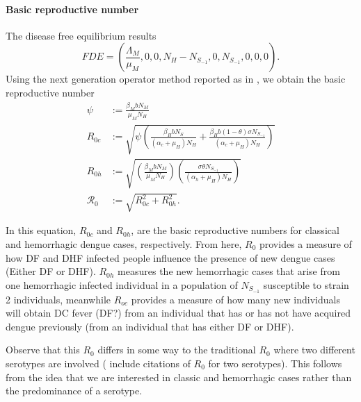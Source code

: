 

%
%
\paragraph{Basic reproductive number}
	The disease free equilibrium results
$$
	FDE=
	\left(
		\frac{\Lambda_M}{\mu_M},
		0,
		0,
		N_H - N_{S_{-1}},
		0,
		N_{S_{-1}},
		0,
		0,
		0
	\right).
$$
Using the next generation operator method 
reported as in \cite{Feng1997a}, we obtain
the basic reproductive number
%
\begin{equation}
	\begin{aligned}
		\psi &:= \frac{\beta_MbN_M}{\mu_MN_H}
		\\
		R_{0c} & := \sqrt{
			\psi
			\left(
				\frac{\beta_HbN_S}{ (\alpha_c + \mu_H)N_H}
				+
				\frac{\beta_Hb(1- \theta ) \sigma N_{S_{-1}}}{ (\alpha_c + \mu_H)N_H}
			\right)}
		\\
		R_{0h}& :=\sqrt{
			\left(\frac{\beta_MbN_M}{\mu_MN_H}\right)
				\left(\frac{
					\sigma \theta N_{S_{-1}}
				}{(\alpha_h + \mu_H)N_H}\right)}
	\\
	\mathcal{R}_0 & :=
			\sqrt{ R_{0c}^2+R_{0h}^2 }.
	\end{aligned}
\end{equation}

	In this equation, $R_{0c}$ and $R_{0h}$, are the basic reproductive numbers 
for classical and hemorrhagic dengue cases, respectively. From here, $R_0$ 
provides a measure of how DF and DHF infected people influence the presence of 
new dengue cases (Either DF or DHF). $R_{0h}$ measures the new hemorrhagic 
cases that arise from one hemorrhagic infected individual in a population of 
$N_{S_{-1}}$ susceptible to strain 2 individuals, meanwhile $R_{oc}$ provides a 
measure of how many new individuals will obtain DC fever (DF?) from an individual 
that has or has not have acquired dengue previously (from an individual that has either
DF or DHF).

	Observe that this $R_0$ differs in some way to the traditional $R_0$ where two
different serotypes are involved (\cite{Feng1997a} include citations of $R_0$ for two serotypes).
This follows from the idea that we are interested in classic and hemorrhagic
cases rather than the predominance of a serotype.




